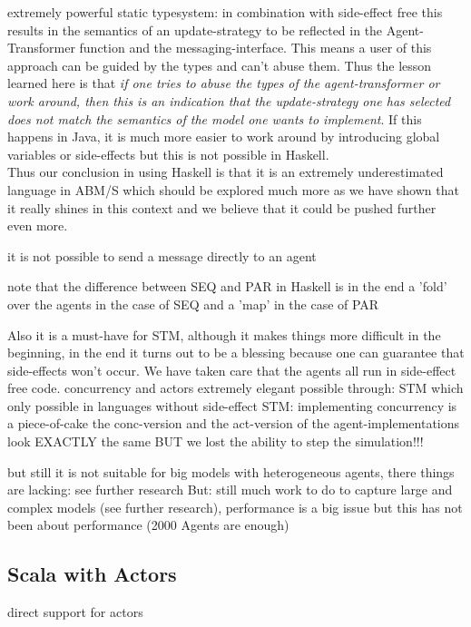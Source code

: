 extremely powerful static typesystem: in combination with side-effect free this results in the semantics of an update-strategy to be reflected in the Agent-Transformer function and the messaging-interface. This means a user of this approach can be guided by the types and can't abuse them. Thus the lesson learned here is that \textit{if one tries to abuse the types of the agent-transformer or work around, then this is an indication that the update-strategy one has selected does not match the semantics of the model one wants to implement}. If this happens in Java, it is much more easier to work around by introducing global variables or side-effects but this is not possible in Haskell. \\
Thus our conclusion in using Haskell is that it is an extremely underestimated language in ABM/S which should be explored much more as we have shown that it really shines in this context and we believe that it could be pushed further even more.

it is not possible to send a message directly to an agent

note that the difference between SEQ and PAR in Haskell is in the end a 'fold' over the agents in the case of SEQ and a 'map' in the case of PAR

Also it is a must-have for STM, although it makes things more difficult in the beginning, in the end it turns out to be a blessing because one can guarantee that side-effects won't occur. We have taken care that the agents all run in side-effect free code.
concurrency and actors extremely elegant possible through: STM which only possible in languages without side-effect	
STM: implementing concurrency is a piece-of-cake
the conc-version and the act-version of the agent-implementations look EXACTLY the same	 BUT we lost the ability to step the simulation!!!

but still it is not suitable for big models with heterogeneous agents, there things are lacking: see further research
But: still much work to do to capture large and complex models (see further research), performance is a big issue but this has not been about performance (2000 Agents are enough)

\subsection{Scala with Actors}
direct support for actors